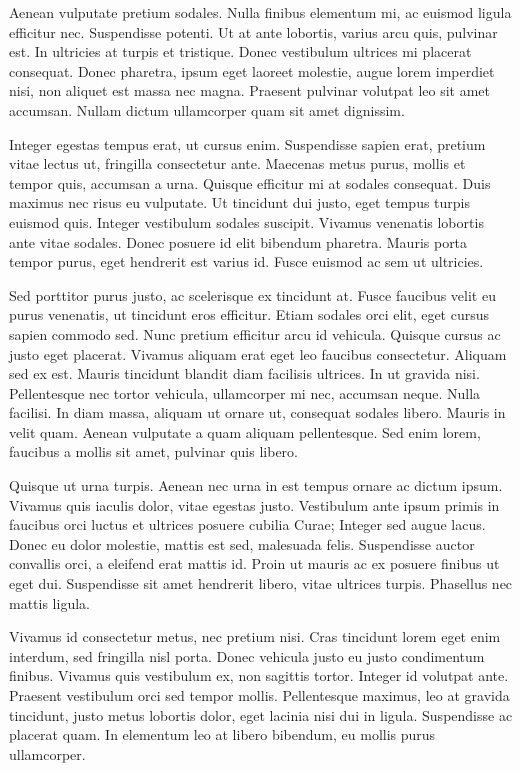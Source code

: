 Aenean vulputate pretium sodales. Nulla finibus elementum mi, ac euismod ligula efficitur nec. Suspendisse potenti. Ut at ante lobortis, varius arcu quis, pulvinar est. In ultricies at turpis et tristique. Donec vestibulum ultrices mi placerat consequat. Donec pharetra, ipsum eget laoreet molestie, augue lorem imperdiet nisi, non aliquet est massa nec magna. Praesent pulvinar volutpat leo sit amet accumsan. Nullam dictum ullamcorper quam sit amet dignissim.

Integer egestas tempus erat, ut cursus enim. Suspendisse sapien erat, pretium vitae lectus ut, fringilla consectetur ante. Maecenas metus purus, mollis et tempor quis, accumsan a urna. Quisque efficitur mi at sodales consequat. Duis maximus nec risus eu vulputate. Ut tincidunt dui justo, eget tempus turpis euismod quis. Integer vestibulum sodales suscipit. Vivamus venenatis lobortis ante vitae sodales. Donec posuere id elit bibendum pharetra. Mauris porta tempor purus, eget hendrerit est varius id. Fusce euismod ac sem ut ultricies.

Sed porttitor purus justo, ac scelerisque ex tincidunt at. Fusce faucibus velit eu purus venenatis, ut tincidunt eros efficitur. Etiam sodales orci elit, eget cursus sapien commodo sed. Nunc pretium efficitur arcu id vehicula. Quisque cursus ac justo eget placerat. Vivamus aliquam erat eget leo faucibus consectetur. Aliquam sed ex est. Mauris tincidunt blandit diam facilisis ultrices. In ut gravida nisi. Pellentesque nec tortor vehicula, ullamcorper mi nec, accumsan neque. Nulla facilisi. In diam massa, aliquam ut ornare ut, consequat sodales libero. Mauris in velit quam. Aenean vulputate a quam aliquam pellentesque. Sed enim lorem, faucibus a mollis sit amet, pulvinar quis libero.

Quisque ut urna turpis. Aenean nec urna in est tempus ornare ac dictum ipsum. Vivamus quis iaculis dolor, vitae egestas justo. Vestibulum ante ipsum primis in faucibus orci luctus et ultrices posuere cubilia Curae; Integer sed augue lacus. Donec eu dolor molestie, mattis est sed, malesuada felis. Suspendisse auctor convallis orci, a eleifend erat mattis id. Proin ut mauris ac ex posuere finibus ut eget dui. Suspendisse sit amet hendrerit libero, vitae ultrices turpis. Phasellus nec mattis ligula.

Vivamus id consectetur metus, nec pretium nisi. Cras tincidunt lorem eget enim interdum, sed fringilla nisl porta. Donec vehicula justo eu justo condimentum finibus. Vivamus quis vestibulum ex, non sagittis tortor. Integer id volutpat ante. Praesent vestibulum orci sed tempor mollis. Pellentesque maximus, leo at gravida tincidunt, justo metus lobortis dolor, eget lacinia nisi dui in ligula. Suspendisse ac placerat quam. In elementum leo at libero bibendum, eu mollis purus ullamcorper.

